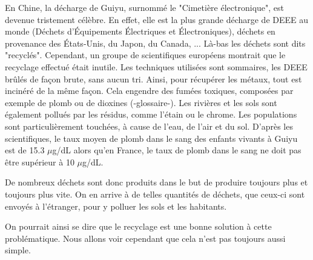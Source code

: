 \bigbreak En Chine, la décharge de Guiyu, surnommé le "Cimetière électronique", est devenue tristement célèbre. En effet, elle est la plus grande décharge de \gls{DEEE} au monde (Déchets d’Équipements Électriques et Électroniques), déchets en provenance des États-Unis, du Japon, du Canada, ... Là-bas les déchets sont dits "recyclés". Cependant, un groupe de scientifiques européens\cite{Deeechine} montrait que	le recyclage effectué était inutile. Les techniques utilisées sont sommaires, les DEEE brûlés de façon brute, sans aucun tri. Ainsi, pour récupérer les métaux, tout est incinéré de la même façon. Cela engendre des fumées toxiques, composées par exemple de plomb ou de dioxines (-glossaire-). Les rivières et les sols sont également pollués par les résidus, comme l'étain ou le chrome. Les populations sont particulièrement touchées, à cause de l'eau, de l'air et du sol. D'après les scientifiques, le taux moyen de plomb dans le sang des enfants vivants à Guiyu est de 15.3 $\mu$g/dL alors qu'en France, le taux de plomb dans le sang ne doit pas être supérieur à 10 $\mu$g/dL. 

\bigbreak De nombreux déchets sont donc produits dans le but de produire toujours plus et toujours plus vite. On en arrive à de telles quantités de déchets, que ceux-ci sont envoyés à l'étranger, pour y polluer les sols et les habitants. 

On pourrait ainsi se dire que le recyclage est une bonne solution à cette problématique. Nous allons voir cependant que cela n'est pas toujours aussi simple.